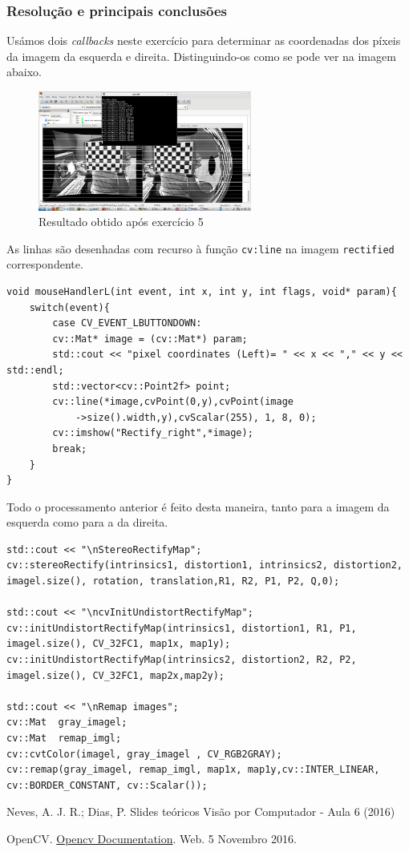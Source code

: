 \documentclass[portuguese, times, mirror]{revdetua}
\begin{document}
\subsubsection{Resolução e principais conclusões}

Usámos dois \textit{callbacks} neste exercício para determinar as coordenadas dos píxeis da imagem da esquerda e direita. Distinguindo-os como se pode ver na imagem abaixo.

\begin{figure}[ht!]
\centering
\includegraphics[width=70mm]{img/ex5.png}
\caption{Resultado obtido após exercício 5}
\end{figure}


As linhas são desenhadas com recurso à função \texttt{cv:line} na imagem \texttt{rectified} correspondente.

\begin{lstlisting}[caption=Função mouseHAndler,label=code:C]
void mouseHandlerL(int event, int x, int y, int flags, void* param){
    switch(event){
        case CV_EVENT_LBUTTONDOWN:
        cv::Mat* image = (cv::Mat*) param;
        std::cout << "pixel coordinates (Left)= " << x << "," << y << std::endl;
        std::vector<cv::Point2f> point;
        cv::line(*image,cvPoint(0,y),cvPoint(image
            ->size().width,y),cvScalar(255), 1, 8, 0);
        cv::imshow("Rectify_right",*image);
        break;
    }
}
\end{lstlisting}

Todo o processamento anterior é feito desta maneira, tanto para a imagem da esquerda como para a da direita. 

\begin{lstlisting}[caption=Função Rectify e remap,label=code:C]
std::cout << "\nStereoRectifyMap";
cv::stereoRectify(intrinsics1, distortion1, intrinsics2, distortion2, imagel.size(), rotation, translation,R1, R2, P1, P2, Q,0);

std::cout << "\ncvInitUndistortRectifyMap";
cv::initUndistortRectifyMap(intrinsics1, distortion1, R1, P1, imagel.size(), CV_32FC1, map1x, map1y);
cv::initUndistortRectifyMap(intrinsics2, distortion2, R2, P2, imagel.size(), CV_32FC1, map2x,map2y);

std::cout << "\nRemap images";
cv::Mat  gray_imagel;
cv::Mat  remap_imgl;
cv::cvtColor(imagel, gray_imagel , CV_RGB2GRAY);
cv::remap(gray_imagel, remap_imgl, map1x, map1y,cv::INTER_LINEAR, cv::BORDER_CONSTANT, cv::Scalar());
\end{lstlisting}


\begin{thebibliography}{1} %



Neves, A. J. R.; Dias, P. Slides teóricos Visão por Computador - Aula 6 (2016)


OpenCV. \href{hhttp://docs.opencv.org/}{Opencv Documentation}. Web. 5 Novembro 2016. 




\end{thebibliography}
\end{document}
